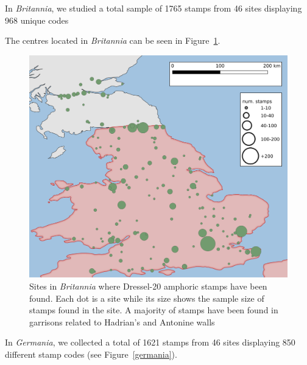 \documentclass[review]{elsarticle}
\newcommand{\memo}[2]{\textcolor{#1}{#2}}
\newcommand{\xavi}[1]{\memo{magenta}{XRC: #1\\}}
\begin{document}
In \textit{Britannia}, we studied a total sample of 1765 stamps from 46 sites displaying 968 unique codes


The centres located in \textit{Britannia} can be seen in Figure~\ref{britannia}.
 
\begin{figure}[htp]
	\centering
\includegraphics[width=\linewidth]{figs/britannia}
\caption{Sites in \textit{Britannia} where Dressel-20 amphoric stamps have been found. Each dot is a site while its size shows the sample size of stamps found in the site. A majority of stamps have been found in garrisons related to Hadrian's and Antonine walls}
\label{britannia}
\end{figure} 



In \textit{Germania}, we collected a total of 1621 stamps from 46 sites displaying 850 different stamp codes (see Figure~\ref{germania}). 
\end{document}

